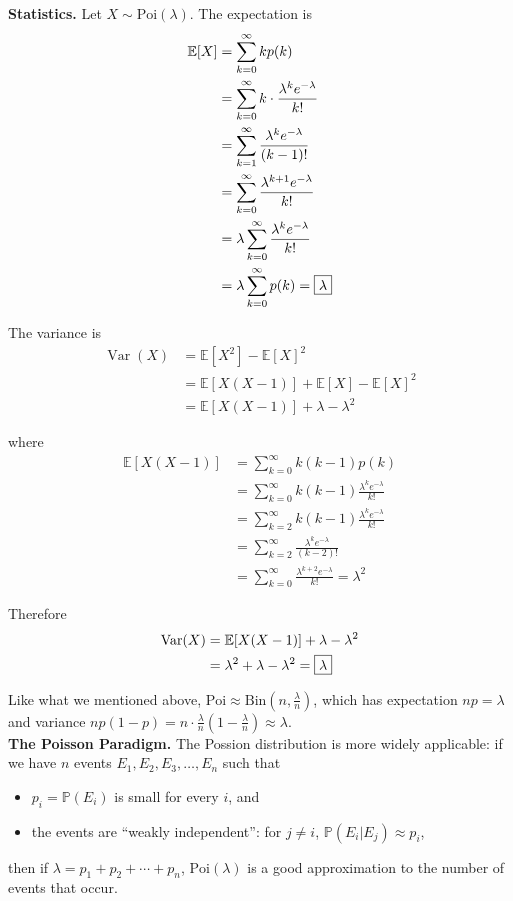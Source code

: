 \documentclass[a4paper,11pt]{amsbook}
\theoremstyle{definition}
\theoremstyle{remark}
\newcommand{\E}{\mathbb{E}}
\renewcommand{\P}{\mathbb{P}}
\DeclareMathOperator\Var{Var}
\newcommand\0{\varnothing}
\newcommand\Bin{\text{Bin}}
\newcommand\Poi{\text{Poi}}
\begin{document}
    \textbf{Statistics.} Let $X\sim\Poi(\lambda)$. The expectation is
    \begin{align*}
        \E[X]&=\sum_{k=0}^\infty kp(k) \\
        &=\sum_{k=0}^\infty k\cdot\frac{\lambda^ke^{-\lambda}}{k!} \\
        &=\sum_{k=1}^\infty\frac{\lambda^ke^{-\lambda}}{(k-1)!} \\
        &=\sum_{k=0}^\infty\frac{\lambda^{k+1}e^{-\lambda}}{k!} \\
        &=\lambda\sum_{k=0}^\infty\frac{\lambda^ke^{-\lambda}}{k!} \\
        &=\lambda\sum_{k=0}^\infty p(k)=\fbox{$\lambda$}
    \end{align*}

    The variance is \begin{align*}
        \Var(X)&=\E[X^2]-\E[X]^2 \\
        &=\E[X(X-1)]+\E[X]-\E[X]^2 \\
        &=\E[X(X-1)]+\lambda-\lambda^2
    \end{align*}

    where \begin{align*}
        \E[X(X-1)]&=\sum_{k=0}^\infty k(k-1)p(k) \\
        &=\sum_{k=0}^\infty k(k-1)\frac{\lambda^ke^{-\lambda}}{k!} \\
        &=\sum_{k=2}^\infty k(k-1)\frac{\lambda^ke^{-\lambda}}{k!} \\
        &=\sum_{k=2}^\infty\frac{\lambda^ke^{-\lambda}}{(k-2)!} \\
        &=\sum_{k=0}^\infty\frac{\lambda^{k+2}e^{-\lambda}}{k!}=\lambda^2
    \end{align*}

    Therefore \begin{align*}
        \Var(X)&=\E[X(X-1)]+\lambda-\lambda^2 \\
        &=\lambda^2+\lambda-\lambda^2=\fbox{$\lambda$}
    \end{align*}

    Like what we mentioned above, $\Poi\approx\Bin(n,\tfrac\lambda n)$,
    which has expectation $np=\lambda$ and variance $np(1-p)=n\cdot\frac{\lambda}{n}\left(1-\frac{\lambda}{n}\right)\approx\lambda$.\\

    \textbf{The Poisson Paradigm.}
    The Possion distribution is more widely applicable: 
    if we have $n$ events $E_1,E_2,E_3,\ldots,E_n$ such that \begin{itemize}
        \item $p_i=\P(E_i)$ is small for every $i$, and
        \item the events are ``weakly independent'': for $j\neq i$, $\P(E_i|E_j)\approx p_i$,
    \end{itemize}
    then if $\lambda=p_1+p_2+\cdots+p_n$,
    $\Poi(\lambda)$ is a good approximation to the number of events that occur.\\
    
\end{document}
